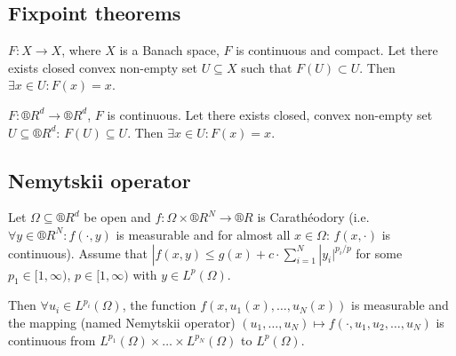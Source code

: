 \documentclass[12pt]{article}					%
\begin{document}
\subsection{Fixpoint theorems}
\begin{veta}
	$F: X \rightarrow X$, where $X$ is a Banach space, $F$ is continuous and compact. Let there exists closed convex non-empty set $U \subseteq X$ such that $F(U) \subset U$. Then $\exists x \in U: F(x) = x$.
\end{veta}

\begin{veta}
	$F: ®R^d \rightarrow ®R^d$, $F$ is continuous. Let there exists closed, convex non-empty set $U \subseteq ®R^d$: $F(U) \subseteq U$. Then $\exists x \in U: F(x) = x$.
\end{veta}

\subsection{Nemytskii operator}
\begin{veta}
	Let $Ω \subseteq ®R^d$ be open and $f: Ω \times ®R^N \rightarrow ®R$ is Carathéodory (i.e. $\forall y \in ®R^N: f(·, y)$ is measurable and for almost all $x \in Ω$: $f(x, ·)$ is continuous). Assume that $|f(x, y) ≤ g(x) + c·\sum_{i=1}^N |y_i|^{p_i / p}$ for some $p_1 \in [1, ∞)$, $p \in [1, ∞)$ with $y \in L^p(Ω)$.

	Then $\forall u_i \in L^{p_i}(Ω)$, the function $f(x, u_1(x), …, u_N(x))$ is measurable and the mapping (named Nemytskii operator) $(u_1, …, u_N) \mapsto f(·, u_1, u_2, …, u_N)$ is continuous from $L^{p_1}(Ω) \times … \times L^{p_N}(Ω)$ to $L^p(Ω)$.
\end{veta}
\end{document}
